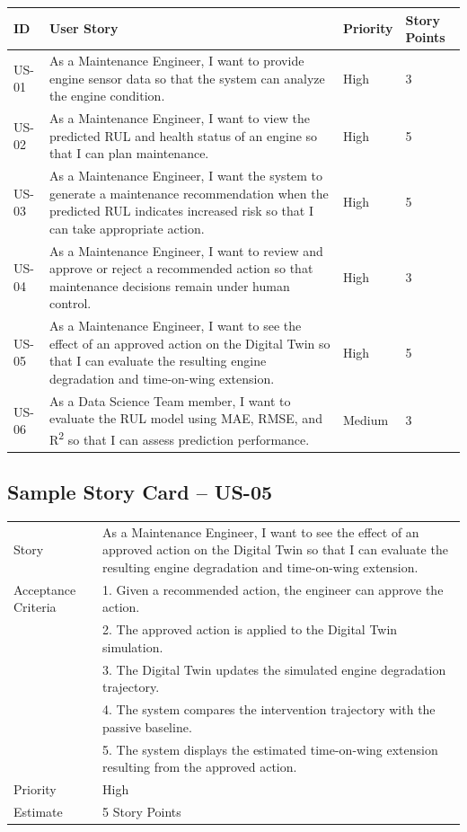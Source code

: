 \documentclass[12pt,a4paper]{report}
\begin{document}
\begin{longtable}{L{2.5cm} L{4.5cm} L{2cm} L{2.7cm}}
\toprule
\textbf{ID} & \textbf{User Story} & \textbf{Priority} & \textbf{Story Points} \\
\midrule
US-01 & As a Maintenance Engineer, I want to provide engine sensor data so that the system can analyze the engine condition. & High & 3 \\
US-02 & As a Maintenance Engineer, I want to view the predicted RUL and health status of an engine so that I can plan maintenance. & High & 5 \\
US-03 & As a Maintenance Engineer, I want the system to generate a maintenance recommendation when the predicted RUL indicates increased risk so that I can take appropriate action. & High & 5 \\
US-04 & As a Maintenance Engineer, I want to review and approve or reject a recommended action so that maintenance decisions remain under human control. & High & 3 \\
US-05 & As a Maintenance Engineer, I want to see the effect of an approved action on the Digital Twin so that I can evaluate the resulting engine degradation and time-on-wing extension. & High & 5 \\
US-06 & As a Data Science Team member, I want to evaluate the RUL model using MAE, RMSE, and R\textsuperscript{2} so that I can assess prediction performance. & Medium & 3 \\
\bottomrule
\end{longtable}

\subsection*{Sample Story Card -- US-05}

\begin{longtable}{L{3cm} L{9.5cm}}
\toprule
Story & As a Maintenance Engineer, I want to see the effect of an approved action on the Digital Twin so that I can evaluate the resulting engine degradation and time-on-wing extension. \\
Acceptance Criteria &
1. Given a recommended action, the engineer can approve the action.\\
& 2. The approved action is applied to the Digital Twin simulation.\\
& 3. The Digital Twin updates the simulated engine degradation trajectory.\\
& 4. The system compares the intervention trajectory with the passive baseline.\\
& 5. The system displays the estimated time-on-wing extension resulting from the approved action. \\
Priority & High \\
Estimate & 5 Story Points \\
\bottomrule
\end{longtable}
\end{document}
